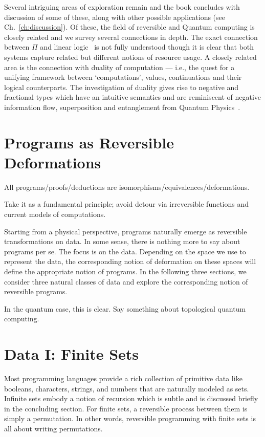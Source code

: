 \documentclass{article}
\begin{document}
Several intriguing areas of exploration remain and the book concludes
with discussion of some of these, along with other possible
applications (see Ch.~\ref{ch:discussion}).  Of these, the field of
reversible and Quantum computing is closely related and we survey
several connections in depth.  The exact connection between $\Pi$ and
linear logic~\cite{Girard87tcs} is not fully understood though it is
clear that both systems capture related but different notions of
resource usage. A closely related area is the connection with duality
of computation \cite{Filinski:89, DBLP:conf/icfp/CurienH00,
  10.1109/LICS.2010.23,Wadler:2003} --- i.e., the quest for a unifying
framework between `computations', values, continuations and their
logical counterparts. The investigation of duality gives rise to
negative and fractional types which have an intuitive semantics and
are reminiscent of negative information flow, superposition and
entanglement from Quantum Physics~\cite{piee}.

\section{Programs as Reversible Deformations} 

All programs/proofs/deductions are  
isomorphisms/equivalences/deformations.  
 
Take it as a fundamental principle; avoid detour via irreversible
functions and current models of computations.

Starting from a physical perspective, programs naturally emerge as
reversible transformations on data. In some sense, there is nothing
more to say about programs per se. The focus is on the data. Depending
on the space we use to represent the data, the corresponding notion of
deformation on these spaces will define the appropriate notion of
programs. In the following three sections, we consider three natural
classes of data and explore the corresponding notion of reversible
programs.

In the quantum case, this is clear. Say something about topological
quantum computing.

\section{Data I: Finite Sets}

Most programming languages provide a rich collection of primitive
data like booleans, characters, strings, and numbers that are
naturally modeled as sets. Infinite sets embody a notion of recursion
which is subtle and is discussed briefly in the concluding
section. For finite sets, a reversible process between them is simply
a permutation. In other words, reversible programming with finite sets
is all about writing permutations. 
\end{document}
